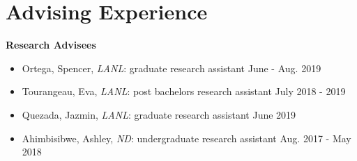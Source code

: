 \documentclass[11pt, letterpaper, roman]{moderncv} %
\begin{document}
\section{Advising Experience}

\textbf{Research Advisees}

\small
    \begin{itemize}
        \item Ortega, Spencer, \textit{LANL}: graduate research assistant \hfill June - Aug. 2019
        \item Tourangeau, Eva, \textit{LANL}: post bachelors research assistant \hfill July 2018 - 2019
        \item Quezada, Jazmin, \textit{LANL}: graduate research assistant \hfill June 2019
        \item Ahimbisibwe, Ashley, \textit{ND}: undergraduate research assistant \hfill Aug. 2017 - May 2018
    \end{itemize}
\normalsize
\end{document}
